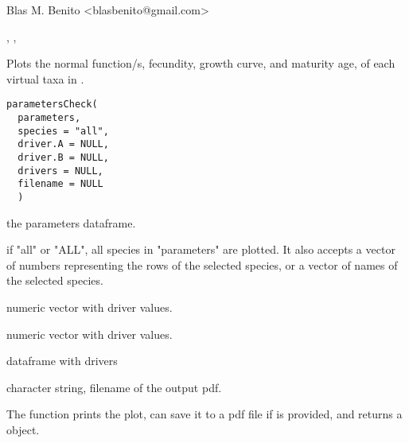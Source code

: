 \documentclass[letterpaper]{book}
\begin{document}
\begin{Details}
\begin{itemize}
\end{itemize}

\end{Details}
%
\begin{Author}\relax
Blas M. Benito  <blasbenito@gmail.com>
\end{Author}
%
\begin{SeeAlso}\relax
{}, , 
\end{SeeAlso}
%
\begin{Description}\relax
Plots the normal function/s, fecundity, growth curve, and maturity age, of each virtual taxa in .
\end{Description}
%
\begin{Usage}
\begin{verbatim}
parametersCheck(
  parameters,
  species = "all",
  driver.A = NULL,
  driver.B = NULL,
  drivers = NULL,
  filename = NULL
  )
\end{verbatim}
\end{Usage}
%
\begin{Arguments}
\begin{ldescription}
\item[\code{parameters}] the parameters dataframe.

\item[\code{species}] if "all" or "ALL", all species in "parameters" are plotted. It also accepts a vector of numbers representing the rows of the selected species, or a vector of names of the selected species.

\item[\code{driver.A}] numeric vector with driver values.

\item[\code{driver.B}] numeric vector with driver values.

\item[\code{drivers}] dataframe with drivers

\item[\code{filename}] character string, filename of the output pdf.
\end{ldescription}
\end{Arguments}
%
\begin{Details}\relax
The function prints the plot, can save it to a pdf file if  is provided, and returns a  object.
\end{Details}
\end{document}
